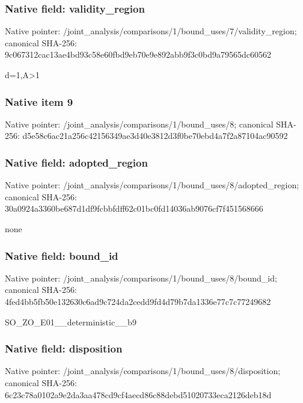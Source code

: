 \documentclass[10pt,a4paper]{article}
\begin{document}
\subsubsection{Native field: validity\_\allowbreak{}region}
Native pointer: /joint\_\allowbreak{}analysis/comparisons/1/bound\_\allowbreak{}uses/7/validity\_\allowbreak{}region; canonical SHA-256: 9c067312cac13ae4bd93c58e60fbd9eb70e9e892abb9f3c0bd9a79565dc60562

\begingroup\raggedright\sloppy d=\allowbreak{}1,\allowbreak{}A>1\par\endgroup

\subsubsection{Native item 9}
Native pointer: /joint\_\allowbreak{}analysis/comparisons/1/bound\_\allowbreak{}uses/8; canonical SHA-256: d5e58c6ac21a256c42156349ae3d40e3812d3f0be70ebd4a7f2a87104ac90592

\subsubsection{Native field: adopted\_\allowbreak{}region}
Native pointer: /joint\_\allowbreak{}analysis/comparisons/1/bound\_\allowbreak{}uses/8/adopted\_\allowbreak{}region; canonical SHA-256: 30a0924a3360be687d1df9fcbbfdff62c01bc0fd14036ab9076cf7f451568666

\begingroup\raggedright\sloppy none\par\endgroup

\subsubsection{Native field: bound\_\allowbreak{}id}
Native pointer: /joint\_\allowbreak{}analysis/comparisons/1/bound\_\allowbreak{}uses/8/bound\_\allowbreak{}id; canonical SHA-256: 4fed4bb5fb50e132630c6ad9c724da2cedd9fd4d79b7da1336e77c7c77249682

\begingroup\raggedright\sloppy SO\_\allowbreak{}ZO\_\allowbreak{}E01\_\allowbreak{}\_\allowbreak{}deterministic\_\allowbreak{}\_\allowbreak{}b9\par\endgroup

\subsubsection{Native field: disposition}
Native pointer: /joint\_\allowbreak{}analysis/comparisons/1/bound\_\allowbreak{}uses/8/disposition; canonical SHA-256: 6c23c78a0102a9e2da3aa478cd9cf4aecd86c88debd51020733eca2126deb18d
\end{document}

